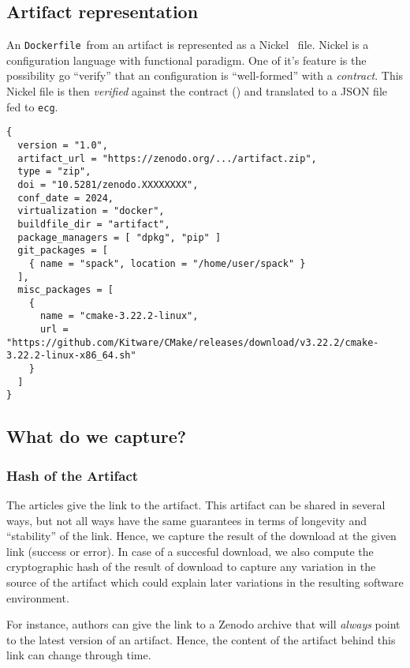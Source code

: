 \documentclass[sigconf,natbib=false]{acmart}
\newcommand{\df}{\texttt{Dockerfile}}
\newcommand{\ecg}{\texttt{ecg}}
\newcommand{\todo}[1]{{\color{red}{TODO: #1}}}
\begin{document}
\subsection{Artifact representation}

An \df\ from an artifact is represented as a Nickel~\cite{nickel} file.
Nickel is a configuration language with functional paradigm.
One of it's feature is the possibility go ``verify'' that an configuration is ``well-formed'' with a \emph{contract}.
This Nickel file is then \emph{verified} against the contract (\todo{link to contract}) and translated to a JSON file fed to \ecg.

\begin{lstlisting}[caption=Example of Artifact representation in the Nickel format.]
{
  version = "1.0",
  artifact_url = "https://zenodo.org/.../artifact.zip",
  type = "zip",
  doi = "10.5281/zenodo.XXXXXXXX",
  conf_date = 2024,
  virtualization = "docker",
  buildfile_dir = "artifact",
  package_managers = [ "dpkg", "pip" ]
  git_packages = [
    { name = "spack", location = "/home/user/spack" }
  ],
  misc_packages = [
    {
      name = "cmake-3.22.2-linux",
      url = "https://github.com/Kitware/CMake/releases/download/v3.22.2/cmake-3.22.2-linux-x86_64.sh"
    }
  ]
}
\end{lstlisting}


\subsection{What do we capture?}

\subsubsection{Hash of the Artifact}

The articles give the link to the artifact.
This artifact can be shared in several ways, but not all ways have the same guarantees in terms of longevity and ``stability'' of the link.
Hence, we capture the result of the download at the given link (success or error).
In case of a succesful download, we also compute the cryptographic hash of the result of download to capture any variation in the source of the artifact which could explain later variations in the resulting software environment.

For instance, authors can give the link to a Zenodo archive that will \emph{always} point to the latest version of an artifact.
Hence, the content of the artifact behind this link can change through time.
\end{document}

